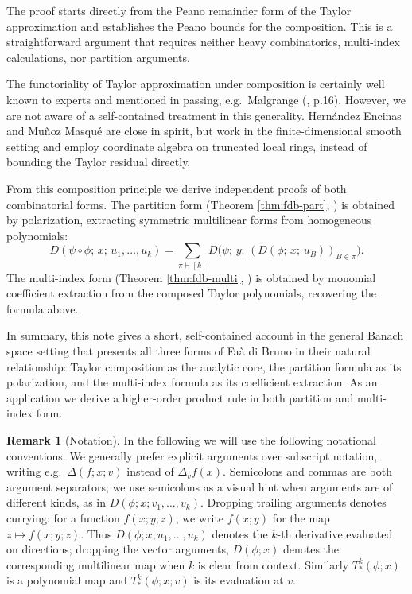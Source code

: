 \documentclass[10pt,a4paper]{article}
\theoremstyle{plain}
\theoremstyle{definition}
\newtheorem{remark}[theorem]{Remark}
\newcommand{\1}{\mathbb{1}} %
\renewcommand{\part}{\vdash} %
\begin{document}
The proof starts directly from the Peano remainder form of the Taylor
approximation and establishes the Peano bounds for the composition. This
is a straightforward argument that requires neither heavy combinatorics,
multi-index calculations, nor partition arguments.

The functoriality of Taylor approximation under composition is certainly
well known to experts and mentioned in passing, e.g.~Malgrange
(\citep{malgrange}, p.16). However, we are not aware of a self-contained
treatment in this generality. Hernández Encinas and Muñoz Masqué
\citep{EM2003} are close in spirit, but work in the finite-dimensional
smooth setting and employ coordinate algebra on truncated local rings,
instead of bounding the Taylor residual directly.

From this composition principle we derive independent proofs of both
combinatorial forms. The partition form (Theorem \ref{thm:fdb-part},
\citep{Levy2006}) is obtained by polarization, extracting symmetric
multilinear forms from homogeneous polynomials: \[
  D(\psi\circ\phi;\, x;\, u_1,\dots,u_k)
  =
  \sum_{\pi \part [k]}
  D\bigl(\psi;\, y;\, (D(\phi;\, x;\, u_B))_{B\in\pi}\bigr).
\] The multi-index form (Theorem \ref{thm:fdb-multi}, \citep{CS1996}) is
obtained by monomial coefficient extraction from the composed Taylor
polynomials, recovering the formula above.

In summary, this note gives a short, self-contained account in the
general Banach space setting that presents all three forms of Faà di
Bruno in their natural relationship: Taylor composition as the analytic
core, the partition formula as its polarization, and the multi-index
formula as its coefficient extraction. As an application we derive a
higher-order product rule in both partition and multi-index form.

\begin{remark}[Notation]

In the following we will use the following notational conventions. We
generally prefer explicit arguments over subscript notation, writing
e.g.~\(\Delta(f; x; v)\) instead of \(\Delta_v f(x)\). Semicolons and
commas are both argument separators; we use semicolons as a visual hint
when arguments are of different kinds, as in
\(D(\phi; x; v_1, \dots, v_k)\). Dropping trailing arguments denotes
currying: for a function \(f(x; y; z)\), we write \(f(x; y)\) for the
map \(z \mapsto f(x; y; z)\). Thus \(D(\phi; x; u_1, \dots, u_k)\)
denotes the \(k\)-th derivative evaluated on directions; dropping the
vector arguments, \(D(\phi; x)\) denotes the corresponding multilinear
map when \(k\) is clear from context. Similarly \(T_{\ast}^k(\phi; x)\)
is a polynomial map and \(T_{\ast}^k(\phi; x; v)\) is its evaluation at
\(v\).

\end{remark}
\end{document}
